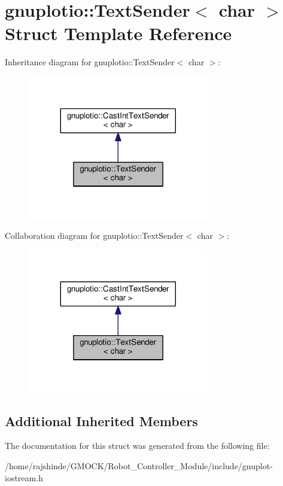 \hypertarget{structgnuplotio_1_1_text_sender_3_01char_01_4}{}\section{gnuplotio\+:\+:Text\+Sender$<$ char $>$ Struct Template Reference}
\label{structgnuplotio_1_1_text_sender_3_01char_01_4}


Inheritance diagram for gnuplotio\+:\+:Text\+Sender$<$ char $>$\+:
\nopagebreak
\begin{figure}[H]
\begin{center}
\leavevmode
\includegraphics[width=224pt]{structgnuplotio_1_1_text_sender_3_01char_01_4__inherit__graph}
\end{center}
\end{figure}


Collaboration diagram for gnuplotio\+:\+:Text\+Sender$<$ char $>$\+:
\nopagebreak
\begin{figure}[H]
\begin{center}
\leavevmode
\includegraphics[width=224pt]{structgnuplotio_1_1_text_sender_3_01char_01_4__coll__graph}
\end{center}
\end{figure}
\subsection*{Additional Inherited Members}


The documentation for this struct was generated from the following file\+:\begin{DoxyCompactItemize}
\item 
/home/rajshinde/\+G\+M\+O\+C\+K/\+Robot\+\_\+\+Controller\+\_\+\+Module/include/gnuplot-\/iostream.\+h\end{DoxyCompactItemize}
